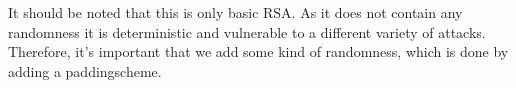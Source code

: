 \documentclass[../master.tex]{subfiles}
\begin{document}

    \vspace{10mm}
    \noindent
    It should be noted that this is only basic RSA. As it does not contain any randomness it is deterministic and vulnerable
    to a different variety of attacks.
    Therefore, it's important that we add some kind of randomness, which is done by adding a paddingscheme.

\end{document}
